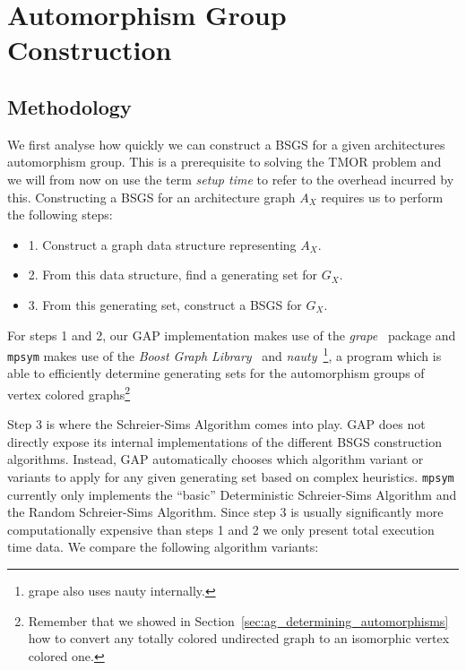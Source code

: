 \section{Automorphism Group Construction}
\label{sec:exp_automorphism_group_construction}

\subsection{Methodology}

We first analyse how quickly we can construct a BSGS for a given architectures
automorphism group. This is a prerequisite to solving the TMOR
problem and we will from now on use the term \textit{setup time} to refer to
the overhead incurred by this. Constructing a BSGS for an architecture
graph $A_X$ requires us to perform the following steps:
%
\begin{itemize}
\item 1. Construct a graph data structure representing $A_X$.
\item 2. From this data structure, find a generating set for $G_X$.
\item 3. From this generating set, construct a BSGS for $G_X$.
\end{itemize}
%
For steps 1 and 2, our GAP implementation makes use of the
\textit{grape}~\cite{grape} package and \texttt{mpsym} makes use of the
\textit{Boost Graph Library}~\cite{BGL} and
\textit{nauty}~\cite{nauty}\footnote{grape also uses nauty internally.}, a
program which is able to efficiently determine generating sets for the
automorphism groups of vertex colored graphs\footnote{Remember that we showed
in Section~\ref{sec:ag_determining_automorphisms} how to convert any totally
colored undirected graph to an isomorphic vertex colored one.}

Step 3 is where the Schreier-Sims Algorithm comes into play. GAP does not
directly expose its internal implementations of the different BSGS construction
algorithms. Instead, GAP automatically chooses which algorithm variant or
variants to apply for any given generating set based on complex heuristics.
\texttt{mpsym} currently only implements the ``basic'' Deterministic
Schreier-Sims Algorithm and the Random Schreier-Sims Algorithm.  Since step 3
is usually significantly more computationally expensive than steps 1 and 2 we
only present total execution time data.  We compare the following algorithm
variants:

